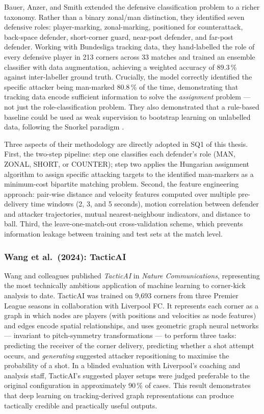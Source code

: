 Bauer, Anzer, and Smith \cite{Bauer2022} extended the defensive
classification problem to a richer taxonomy. Rather than a binary zonal/man
distinction, they identified seven defensive roles: player-marking, zonal-marking,
positioned for counterattack, back-space defender, short-corner guard, near-post
defender, and far-post defender. Working with Bundesliga tracking data, they
hand-labelled the role of every defensive player in 213 corners across 33 matches
and trained an ensemble classifier with data augmentation, achieving a weighted
accuracy of 89.3\,\% against inter-labeller ground truth. Crucially, the model
correctly identified the specific attacker being man-marked 80.8\,\% of the time,
demonstrating that tracking data encode sufficient information to solve the
\emph{assignment} problem --- not just the role-classification problem. They also
demonstrated that a rule-based baseline could be used as weak supervision to
bootstrap learning on unlabelled data, following the Snorkel paradigm
\citep{Ratner2017}.

Three aspects of their methodology are directly adopted in SQ1 of this thesis.
First, the two-step pipeline: step one classifies each defender's role (MAN,
ZONAL, SHORT, or COUNTER); step two applies the Hungarian assignment algorithm
to assign specific attacking targets to the identified man-markers as a
minimum-cost bipartite matching problem. Second, the feature engineering approach:
pair-wise distance and velocity features computed over multiple pre-delivery
time windows (2, 3, and 5 seconds), motion correlation between defender and
attacker trajectories, mutual nearest-neighbour indicators, and distance to
ball. Third, the leave-one-match-out cross-validation scheme, which prevents
information leakage between training and test sets at the match level.

\subsubsection{Wang et al.\ (2024): TacticAI}

Wang and colleagues \cite{Wang2024} published \emph{TacticAI} in
\emph{Nature Communications}, representing the most technically ambitious
application of machine learning to corner-kick analysis to date. TacticAI was
trained on 9{,}693 corners from three Premier League seasons in collaboration
with Liverpool FC. It represents each corner as a graph in which nodes are
players (with positions and velocities as node features) and edges encode spatial
relationships, and uses geometric graph neural networks --- invariant to
pitch-symmetry transformations --- to perform three tasks: predicting the
receiver of the corner delivery, predicting whether a shot attempt occurs, and
\emph{generating} suggested attacker repositioning to maximise the probability
of a shot. In a blinded evaluation with Liverpool's coaching and analysis staff,
TacticAI's suggested player setups were judged preferable to the original
configuration in approximately 90\,\% of cases. This result demonstrates that
deep learning on tracking-derived graph representations can produce tactically
credible and practically useful outputs.

